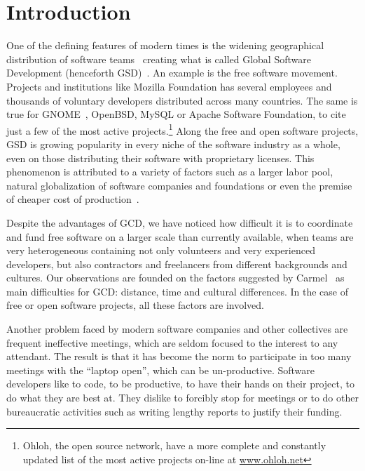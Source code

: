 \documentclass[letterpaper]{article}
\newcommand{\indraftnote}[1]{\textcolor{blue}{\texttt{\footnotesize[#1]}}}
\newcommand{\todo}[1]{\indraftnote{todo: #1}}
\begin{document}


\section{Introduction}

One of the defining features of modern times is the widening
geographical distribution of software teams~\cite{last2003} creating
what is called Global Software Development (henceforth
GSD)~\cite{german2003}. An example is the free software
movement. Projects and institutions like Mozilla Foundation has several
employees and thousands of voluntary developers distributed across
many countries. The same is true for GNOME~\cite{german2003}, OpenBSD,
MySQL or Apache Software Foundation, to cite just a few of the most active
projects.\footnote{Ohloh, the open source network, have a more complete
  and constantly updated list of the most active projects on-line at
  \url{www.ohloh.net}} Along the free and open software
projects, GSD is growing popularity in every niche of the software
industry as a whole, even on those distributing their software with
proprietary licenses. This phenomenon is attributed to a variety of factors
such as a larger labor pool, natural globalization of software companies
and foundations or even the premise of cheaper cost of
production~\cite{komi2005}.

Despite the advantages of GCD, we have noticed how
difficult it is to coordinate and fund free software on a larger scale
than currently available, when teams are very heterogeneous containing
not only volunteers and very experienced developers, but also
contractors and freelancers from different backgrounds and cultures. Our observations
are founded on the factors suggested by Carmel~\cite{carmel1999} as
main difficulties for GCD: distance, time and cultural differences. In
the case of free or open software projects, all these factors are
involved.

Another problem faced by modern software companies and other
collectives are frequent ineffective meetings, which are seldom
focused to the interest to any attendant. The result is that it has
become the norm to participate in too many meetings with the ``laptop
open'', which can be un-productive. Software developers
like to code, to be productive, to have their hands on their project,
to do what they are best at. They dislike to forcibly stop for meetings
or to do other bureaucratic activities such as writing lengthy reports to justify their funding.
\end{document}
